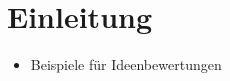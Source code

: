 \section{Einleitung}\label{sec:einleitung}
\begin{itemize}
    \item Beispiele für Ideenbewertungen
\end{itemize}